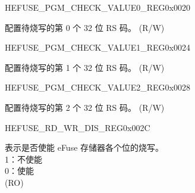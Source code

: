 \begin{register}{H}{EFUSE\_PGM\_CHECK\_VALUE0\_REG}{0x0020}\label{regdesc:EFUSEPGMCHECKVALUE0REG}
%
\regnewline%
\begin{regdesc}\begin{reglist}
\label{fielddesc:EFUSEPGMRSDATA0}\item [EFUSE\_PGM\_RS\_DATA\_0] 配置待烧写的第 0 个 32 位 RS 码。 (R/W)
\end{reglist}\end{regdesc}
\end{register}


\begin{register}{H}{EFUSE\_PGM\_CHECK\_VALUE1\_REG}{0x0024}\label{regdesc:EFUSEPGMCHECKVALUE1REG}
%
\regnewline%
\begin{regdesc}\begin{reglist}
\label{fielddesc:EFUSEPGMRSDATA1}\item [EFUSE\_PGM\_RS\_DATA\_1] 配置待烧写的第 1 个 32 位 RS 码。 (R/W)
\end{reglist}\end{regdesc}
\end{register}


\begin{register}{H}{EFUSE\_PGM\_CHECK\_VALUE2\_REG}{0x0028}\label{regdesc:EFUSEPGMCHECKVALUE2REG}
%
\regnewline%
\begin{regdesc}\begin{reglist}
\label{fielddesc:EFUSEPGMRSDATA2}\item [EFUSE\_PGM\_RS\_DATA\_2] 配置待烧写的第 2 个 32 位 RS 码。 (R/W)
\end{reglist}\end{regdesc}
\end{register}


\begin{register}{H}{EFUSE\_RD\_WR\_DIS\_REG}{0x002C}\label{regdesc:EFUSERDWRDISREG}
%
\regnewline%
\begin{regdesc}\begin{reglist}
\label{fielddesc:EFUSEWRDIS}\item [EFUSE\_WR\_DIS] 表示是否使能 eFuse 存储器各个位的烧写。\\
1：不使能\\
0：使能\\
(RO)
\end{reglist}\end{regdesc}
\end{register}


